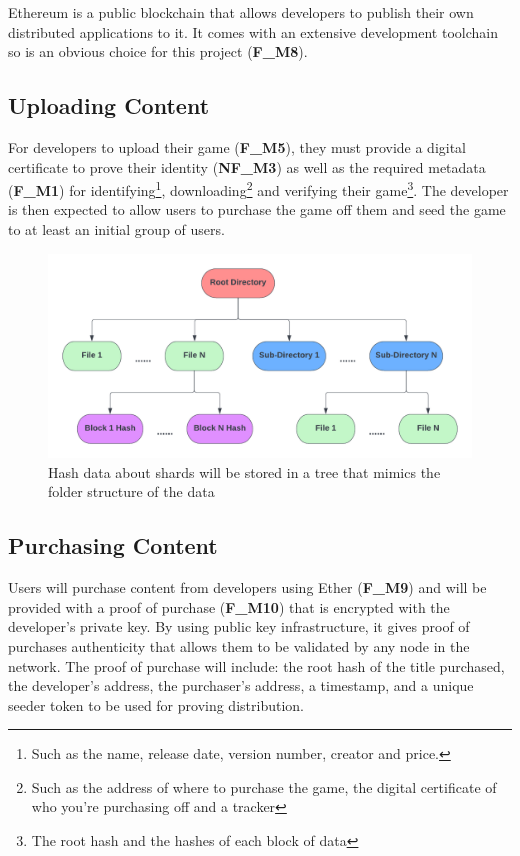 \noindent Ethereum is a public blockchain that allows developers to publish their own distributed applications to it. It comes with an extensive development toolchain so is an obvious choice for this project (\textbf{F\_M8}).

\subsection*{Uploading Content}
\label{subsec:upload-content}

For developers to upload their game (\textbf{F\_M5}), they must provide a digital certificate to prove their identity (\textbf{NF\_M3}) as well as the required metadata (\textbf{F\_M1}) for identifying\footnote{Such as the name, release date, version number, creator and price.},
downloading\footnote{Such as the address of where to purchase the game, the digital certificate of who you're purchasing off and a tracker} and verifying their game\footnote{The root hash and the hashes of each block of data}. 
The developer is then expected to allow users to purchase the game off them and seed the game to at least an initial group of users.

\begin{figure}[ht]
  \centering
  \includegraphics[width=.85\textwidth]{assets/images/diagrams/block-body.png}
  \caption{Hash data about shards will be stored in a tree that mimics the folder structure of the data}
  \label{fig:hash-storage}
\end{figure}

\subsection*{Purchasing Content}

Users will purchase content from developers using Ether (\textbf{F\_M9}) and will be provided with a proof of purchase (\textbf{F\_M10}) that is encrypted with the developer's private key. By using public key infrastructure, it gives proof of purchases authenticity that allows them to be validated by any node in the network. 
The proof of purchase will include: the root hash of the title purchased, the developer's address, the purchaser's address, a timestamp, and a unique seeder token to be used for proving distribution.

